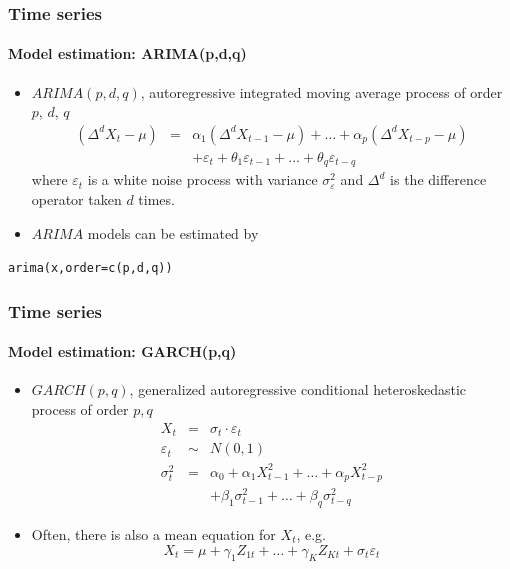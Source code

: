 \documentclass[title={Introduction to R}, author={Mutschler and Zaharieva}, inst={Institute for Econometrics and Empirical Economics}]{beamer}
\begin{document}
\begin{frame}
	\frametitle{Time series}
	\framesubtitle{Model estimation: ARIMA(p,d,q)}	
	\begin{itemize}
		\item $ARIMA(p,d,q)$, autoregressive integrated moving average process of
		order $p$, $d$, $q$%
		\begin{eqnarray*}
			\left( \Delta^d X_{t}-\mu \right)  &=&\alpha _{1}\left( \Delta^d X_{t-1}-\mu \right) +\ldots
			+\alpha _{p}\left( \Delta^d X_{t-p}-\mu \right)  \\
			&&+\varepsilon _{t}+\theta _{1}\varepsilon _{t-1}+\ldots +\theta
			_{q}\varepsilon _{t-q}
		\end{eqnarray*}%
		where $\varepsilon _{t}$ is a white noise process with variance $\sigma
		_{\varepsilon }^{2}$ and $\Delta^d$ is the difference operator taken $d$ times. 
		\item $ARIMA$ models can be estimated by 
	\end{itemize}	
	\begin{center}
		\texttt{arima(x,order=c(p,d,q))}
	\end{center}
\end{frame}


\begin{frame}
	\frametitle{Time series}	
	\framesubtitle{Model estimation: GARCH(p,q)}	
	\begin{itemize}
		\item $GARCH(p,q)$, generalized autoregressive conditional heteroskedastic
		process of order $p,q$%
		\begin{eqnarray*}
			X_{t} &=&\sigma _{t}\cdot \varepsilon _{t} \\
			\varepsilon _{t} &\sim &N(0,1) \\
			\sigma _{t}^{2} &=&\alpha _{0}+\alpha _{1}X_{t-1}^{2}+\ldots +\alpha
			_{p}X_{t-p}^{2} \\
			&&+\beta _{1}\sigma _{t-1}^{2}+\ldots +\beta _{q}\sigma _{t-q}^{2}
		\end{eqnarray*}		
		\item Often, there is also a mean equation for $X_{t}$, e.g.%
		\begin{equation*}
		X_{t}=\mu +\gamma _{1}Z_{1t}+\ldots +\gamma _{K}Z_{Kt}+\sigma
		_{t}\varepsilon _{t}
		\end{equation*}
	\end{itemize}
\end{frame}
\end{document}
